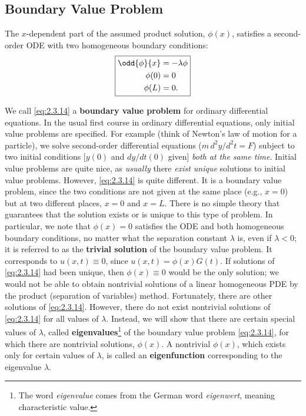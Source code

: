 \subsection{Boundary Value Problem}
\label{sec:2.3.4}

The $x$-dependent part of the assumed product solution, $\phi(x)$, satisfies a second-order ODE with two homogeneous boundary conditions:
\begin{equation}
\label{eq:2.3.14}
\boxed{\begin{aligned}
\odd{\phi}{x} &= -\lambda\phi \\
\phi(0) &= 0 \\
\phi(L) &= 0.
\end{aligned}}
\end{equation}

We call \eqref{eq:2.3.14} a \textbf{boundary value problem} for ordinary differential equations. In the usual first course in ordinary differential equations, only initial value problems are specified. For example (think of Newton's law of motion for a particle), we solve second-order differential equations ($m\,d^2y/d^2t = F$) subject to two initial conditions [$y(0)$ and $dy/dt(0)$ given] \emph{both at the same time}. Initial value problems are quite nice, as \emph{usually} there \emph{exist unique} solutions to initial value problems. However, \eqref{eq:2.3.14} is quite different. It is a boundary value problem, since the two conditions are not given at the same place (e.g., $x = 0$) but at two different places, $x = 0$ and $x = L$. There is no simple theory that guarantees that the solution exists or is unique to this type of problem. In particular, we note that $\phi(x) = 0$ satisfies the ODE and both homogeneous boundary conditions, no matter what the separation constant $\lambda$ is, even if $\lambda < 0$; it is referred to as the \textbf{trivial solution} of the boundary value problem. It corresponds to $u(x,t) \equiv 0$, since $u(x,t) = \phi(x)G(t)$. If solutions of \eqref{eq:2.3.14} had been unique, then $\phi(x) \equiv 0$ would be the only solution; we would not be able to obtain nontrivial solutions of a linear homogeneous PDE by the product (separation of variables) method. Fortunately, there are other solutions of \eqref{eq:2.3.14}. However, there do not exist nontrivial solutions of \eqref{eq:2.3.14} for all values of $\lambda$. Instead, we will show that there are certain special values of $\lambda$, called \textbf{eigenvalues}\footnote{The word \emph{eigenvalue} comes from the German word \emph{eigenwert}, meaning characteristic value.} of the boundary value problem \eqref{eq:2.3.14}, for which there are nontrivial solutions, $\phi(x)$. A nontrivial $\phi(x)$, which exists only for certain values of $\lambda$, is called an \textbf{eigenfunction} corresponding to the eigenvalue $\lambda$.

